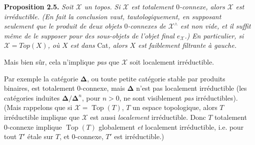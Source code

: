\documentclass[11pt]{article}
\newcommand{\msp}[1]{\marginpar{\footnotesize [#1]}}
\newcommand{\sX}{\mathscr{X}} %
\begin{document}
\noindent\textbf{Proposition 2.5.} \textit{Soit $\sX$ un topos. Si $\sX$ est totalement $0$-connexe, alors $\sX$ est irréductible. (En fait la conclusion vaut, tautologiquement, en supposant seulement que le produit de deux objets $0$-connexes de $\sX^{\wedge}$ est non vide, et il suffit même de le supposer pour des sous-objets de l'objet final $e_{\sX}$.) En particulier, si $\sX = \mathit{Top}(X)$, où $X$ est dans} Cat\textit{, alors $X$ est faiblement filtrante à gauche.}

Mais bien sûr, cela n'implique \textit{pas} que $\sX$ soit localement irréductible.

\msp{page 19}

\noindent Par exemple la catégorie $\mathbf{\Delta}$, ou toute petite catégorie stable par produits binaires, est totalement 0-connexe, mais $\mathbf{\Delta}$ n'est pas localement irréductible (les catégories induites $\mathbf{\Delta}/\mathbf{\Delta}^n$, pour $n > 0$, ne sont visiblement \textit{pas} irréductibles). (Mais rappelons que si $\sX = \operatorname{Top}(T)$, $T$ un espace topologique, alors $T$ irréductible implique que $\sX$ est aussi \textit{localement} irréductible. Donc $T$ totalement 0-connexe implique $\operatorname{Top}(T)$ globalement \textit{et} localement irréductible, i.e. pour tout $T'$ étale sur $T$, et 0-connexe, $T'$ est irréductible.)
\end{document}

